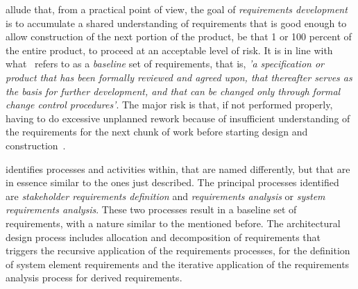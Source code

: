 \documentclass[dissertation,final]{softeng}
\begin{document}
\citet{Wiegers2013} allude that, from a practical point of view, the goal of \emph{requirements development} is to accumulate a shared understanding of requirements that is good enough to allow construction of the next portion of the product, be that 1 or 100 percent of the entire product, to proceed at an acceptable level of risk. It is in line with what~ refers to as a \emph{baseline} set of requirements, that is, \emph{'a specification or product that has been formally reviewed and agreed upon, that thereafter serves as the basis for further development, and that can be changed only through formal change control procedures'}. The major risk is that, if not performed properly, having to do excessive unplanned rework because of insufficient understanding of the requirements for the next chunk of work before starting design and construction~\citep{Wiegers2013}.

 identifies processes and activities within, that are named differently, but that are in essence similar to the ones just described. The principal processes identified are \emph{stakeholder requirements definition} and \emph{requirements analysis} or \emph{system requirements analysis}. These two processes result in a baseline set of requirements, with a nature similar to the mentioned before. The architectural design process includes allocation and decomposition of requirements that triggers the recursive application of the requirements processes, for the definition of system element requirements and the iterative application of the requirements analysis process for derived requirements.
\end{document}

